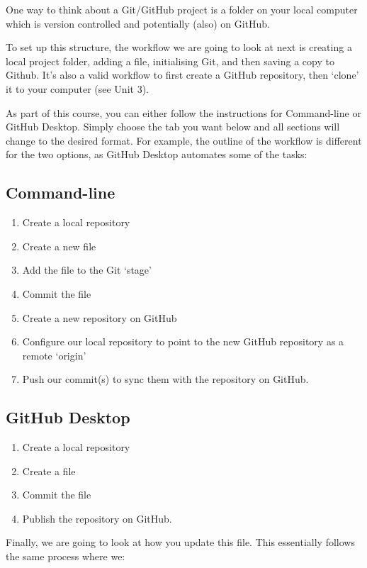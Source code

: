 \documentclass[
  letterpaper,
  DIV=11,
  numbers=noendperiod]{scrartcl}
\begin{document}
One way to think about a Git/GitHub project is a folder on your local
computer which is version controlled and potentially (also) on GitHub.

To set up this structure, the workflow we are going to look at next is
creating a local project folder, adding a file, initialising Git, and
then saving a copy to Github. It's also a valid workflow to first create
a GitHub repository, then `clone' it to your computer (see Unit 3).

As part of this course, you can either follow the instructions for
Command-line or GitHub Desktop. Simply choose the tab you want below and
all sections will change to the desired format. For example, the outline
of the workflow is different for the two options, as GitHub Desktop
automates some of the tasks:

\subsection{Command-line}

\begin{enumerate}
\def\labelenumi{\arabic{enumi}.}
\item
  Create a local repository
\item
  Create a new file
\item
  Add the file to the Git `stage'
\item
  Commit the file
\item
  Create a new repository on GitHub
\item
  Configure our local repository to point to the new GitHub repository
  as a remote `origin'
\item
  Push our commit(s) to sync them with the repository on GitHub.
\end{enumerate}

\subsection{GitHub Desktop}

\begin{enumerate}
\def\labelenumi{\arabic{enumi}.}
\item
  Create a local repository
\item
  Create a file
\item
  Commit the file
\item
  Publish the repository on GitHub.
\end{enumerate}

Finally, we are going to look at how you update this file. This
essentially follows the same process where we:
\end{document}
